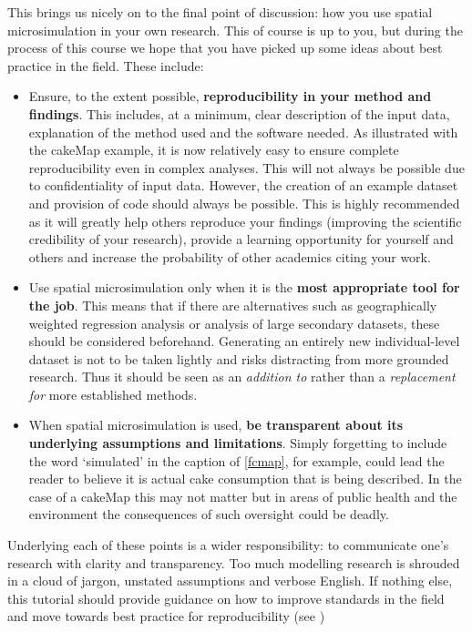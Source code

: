 \documentclass[a4paper, 11pt, twoside]{article}
\begin{document}
This brings us nicely on to the final point of discussion: how you use spatial microsimulation in
your own research. This of course is up to you, but during the process of this course we hope that
you have picked up some ideas about best practice in the field. These include:
\begin{itemize}
 \item Ensure, to the extent possible, \textbf{reproducibility in your method and findings}. This includes, at a minimum,
clear description of the input data, explanation of the method used and the software needed. As illustrated
with the cakeMap example, it is now relatively easy to ensure complete reproducibility even in complex analyses.
This will not always be possible due to confidentiality of input data. However, the creation of an example dataset
and provision of code should always be possible. This is highly recommended as it will greatly help others reproduce
your findings (improving the scientific credibility of your research), provide a learning opportunity for yourself and
others and increase the probability of other academics citing your work.
 \item Use spatial microsimulation only when it is the \textbf{most appropriate tool for the job}. 
This means that if there are alternatives such as geographically weighted regression analysis
or analysis of large secondary datasets, these should be considered beforehand. Generating an entirely
new individual-level dataset is not to be taken lightly and risks distracting from more grounded research.
Thus it should be seen as an \emph{addition to} rather than a \emph{replacement for} more established methods.
\item When spatial microsimulation is used, \textbf{be transparent about its underlying assumptions and limitations}.
Simply forgetting to include the word `simulated' in the caption of \cref{fcmap}, for example, could lead
the reader to believe it is actual cake consumption that is being described. In the case
of a cakeMap this may not matter but in areas of public health and the environment the consequences
of such oversight could be deadly.
\end{itemize}

Underlying each of these points is a wider responsibility: to communicate one's research
with clarity and transparency. Too much modelling research is shrouded in a cloud of jargon,
unstated assumptions and verbose English. If nothing else, this tutorial should
provide guidance on how to improve standards in the field and move towards best practice
for reproducibility (see \citep{Peng2006})
\end{document}
